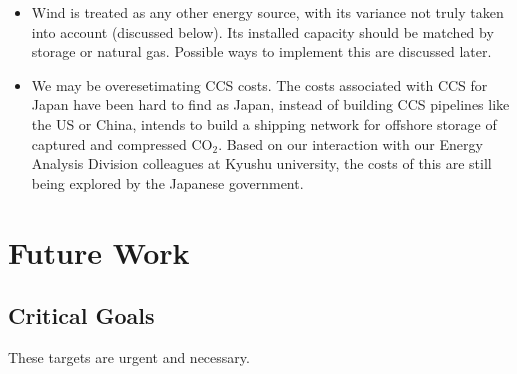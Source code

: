 \documentclass[14pt,a4paper]{article} %
\begin{document}
\begin{enumerate}
\begin{itemize}
\item Wind is treated as any other energy source, with its variance not truly taken into account (discussed below). Its installed capacity should be matched by storage or natural gas. Possible ways to implement this are discussed later.

\item We may be overesetimating CCS costs. The costs associated with CCS for Japan have been hard to find as Japan, instead of building CCS pipelines like the US or China, intends to build a shipping network for offshore storage of captured and compressed CO$_2$. Based on our interaction with our Energy Analysis Division colleagues at Kyushu university, the costs of this are still being explored by the Japanese government.

\end{itemize}

\end{enumerate}

\section{Future Work} 

\subsection{Critical Goals}
These targets are urgent and necessary.
\end{document}
